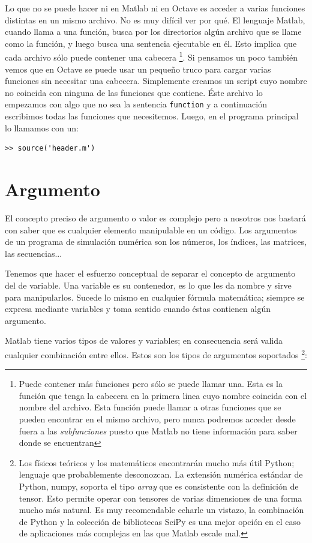 Lo que no se puede hacer ni en Matlab ni en Octave es acceder a varias
funciones distintas en un mismo archivo. No es muy difícil ver por
qué. El lenguaje Matlab, cuando llama a una función, busca por los
directorios algún archivo que se llame como la función, y luego busca
una sentencia ejecutable en él. Esto implica que cada archivo sólo
puede contener una cabecera%
\footnote{Puede contener más funciones pero sólo se puede llamar una.
  Esta es la función que tenga la cabecera en la primera linea cuyo
  nombre coincida con el nombre del archivo. Esta función puede llamar
  a otras funciones que se pueden encontrar en el mismo archivo, pero
  nunca podremos acceder desde fuera a las \emph{subfunciones} puesto
  que Matlab no tiene información para saber donde se encuentran%
}. Si pensamos un poco también vemos que en Octave se puede usar un
pequeño truco para cargar varias funciones sin necesitar una cabecera.
Simplemente creamos un script cuyo nombre no coincida con ninguna de
las funciones que contiene. Éste archivo lo empezamos con algo que no
sea la sentencia \texttt{function} y a continuación escribimos todas
las funciones que necesitemos. Luego, en el programa principal lo
llamamos con un:

\begin{lstlisting}
>> source('header.m')
\end{lstlisting}

\section{Argumento}

El concepto preciso de argumento o valor es complejo pero a nosotros
nos bastará con saber que es cualquier elemento manipulable en un
código.  Los argumentos de un programa de simulación numérica son los
números, los índices, las matrices, las secuencias...

Tenemos que hacer el esfuerzo conceptual de separar el concepto de
argumento del de variable. Una variable es su contenedor, es lo que
les da nombre y sirve para manipularlos. Sucede lo mismo en cualquier
fórmula matemática; siempre se expresa mediante variables y toma
sentido cuando éstas contienen algún argumento.

Matlab tiene varios tipos de valores y variables; en consecuencia será
valida cualquier combinación entre ellos. Estos son los tipos de
argumentos soportados%
\footnote{Los físicos teóricos y los matemáticos encontrarán mucho más
  útil Python; lenguaje que probablemente desconozcan. La extensión
  numérica estándar de Python, numpy, soporta el tipo \emph{array}
  que es consistente con la definición de tensor. Esto permite operar
  con tensores de varias dimensiones de una forma mucho más natural.
  Es muy recomendable echarle un vistazo, la combinación de Python y
  la colección de bibliotecas SciPy es una mejor opción en el caso de
  aplicaciones más complejas en las que Matlab escale mal.%
}:


